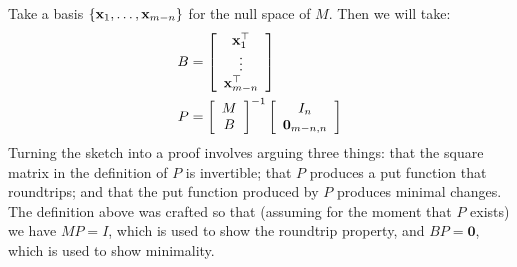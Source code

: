 Take a basis $\{\mathbf x_1,\ldots,\mathbf x_{m-n}\}$ for the null space of $M$. Then
we will take:
\begin{align*}
    B &= \left[\begin{array}{c}
            \mathbf x_1^\top \\
            \vdots \\
            \mathbf x_{m-n}^\top
        \end{array}\right] \\
    P &= \left[\begin{array}{c}
            M \\
            B
        \end{array}\right]^{-1}
        \left[\begin{array}{c}
            I_n \\
            \mathbf 0_{m-n,n}
        \end{array}\right] \\
\end{align*}
Turning the sketch into a proof involves arguing three things: that the
square matrix in the definition of $P$ is invertible; that $P$ produces a
put function that roundtrips; and that the put function produced by $P$
produces minimal changes. The definition above was crafted so that (assuming
for the moment that $P$ exists) we have $MP = I$, which is used to show the
roundtrip property, and $BP = \mathbf 0$, which is used to show minimality.


